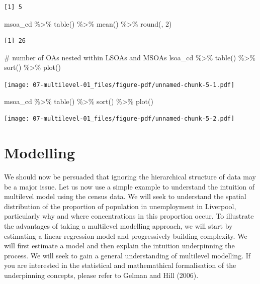\documentclass[
  letterpaper,
  DIV=11,
  numbers=noendperiod,
  oneside]{scrreprt}
\newenvironment{Shaded}{\begin{snugshade}}{\end{snugshade}}
\newcommand{\CommentTok}[1]{\textcolor[rgb]{0.37,0.37,0.37}{#1}}
\newcommand{\DecValTok}[1]{\textcolor[rgb]{0.68,0.00,0.00}{#1}}
\newcommand{\FunctionTok}[1]{\textcolor[rgb]{0.28,0.35,0.67}{#1}}
\newcommand{\NormalTok}[1]{\textcolor[rgb]{0.00,0.23,0.31}{#1}}
\newcommand{\SpecialCharTok}[1]{\textcolor[rgb]{0.37,0.37,0.37}{#1}}
\begin{document}
\begin{verbatim}
[1] 5
\end{verbatim}

\begin{Shaded}
\begin{Highlighting}[]
\NormalTok{msoa\_cd }\SpecialCharTok{\%\textgreater{}\%} \FunctionTok{table}\NormalTok{() }\SpecialCharTok{\%\textgreater{}\%}
  \FunctionTok{mean}\NormalTok{() }\SpecialCharTok{\%\textgreater{}\%}
  \FunctionTok{round}\NormalTok{(, }\DecValTok{2}\NormalTok{)}
\end{Highlighting}
\end{Shaded}

\begin{verbatim}
[1] 26
\end{verbatim}

\begin{Shaded}
\begin{Highlighting}[]
\CommentTok{\# number of OAs nested within LSOAs and MSOAs}
\NormalTok{lsoa\_cd }\SpecialCharTok{\%\textgreater{}\%} \FunctionTok{table}\NormalTok{() }\SpecialCharTok{\%\textgreater{}\%}
  \FunctionTok{sort}\NormalTok{() }\SpecialCharTok{\%\textgreater{}\%}
  \FunctionTok{plot}\NormalTok{()}
\end{Highlighting}
\end{Shaded}

\texttt{[image: 07-multilevel-01\_files/figure-pdf/unnamed-chunk-5-1.pdf]}

\begin{Shaded}
\begin{Highlighting}[]
\NormalTok{msoa\_cd }\SpecialCharTok{\%\textgreater{}\%} \FunctionTok{table}\NormalTok{() }\SpecialCharTok{\%\textgreater{}\%}
  \FunctionTok{sort}\NormalTok{() }\SpecialCharTok{\%\textgreater{}\%}
  \FunctionTok{plot}\NormalTok{()}
\end{Highlighting}
\end{Shaded}

\texttt{[image: 07-multilevel-01\_files/figure-pdf/unnamed-chunk-5-2.pdf]}

\section{Modelling}\label{modelling}

We should now be persuaded that ignoring the hierarchical structure of
data may be a major issue. Let us now use a simple example to understand
the intuition of multilevel model using the census data. We will seek to
understand the spatial distribution of the proportion of population in
unemployment in Liverpool, particularly why and where concentrations in
this proportion occur. To illustrate the advantages of taking a
multilevel modelling approach, we will start by estimating a linear
regression model and progressively building complexity. We will first
estimate a model and then explain the intuition underpinning the
process. We will seek to gain a general understanding of multilevel
modelling. If you are interested in the statistical and mathemathical
formalisation of the underpinning concepts, please refer to Gelman and
Hill (2006).
\end{document}

